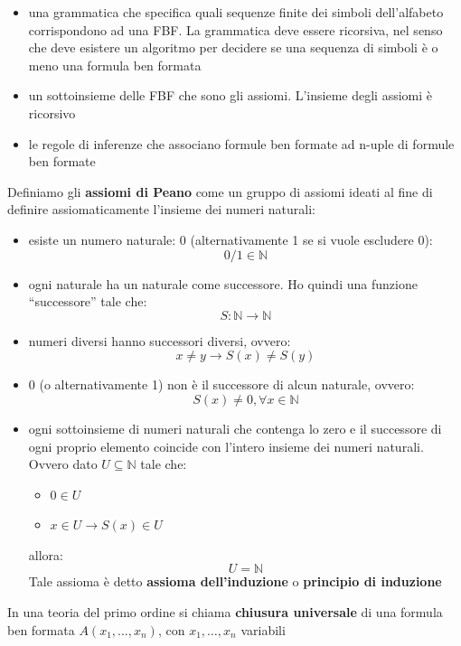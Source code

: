 \documentclass[a4paper,12pt, oneside]{book}
\begin{document}
\begin{shaded}
\begin{definizione}
\begin{itemize}
      \item una grammatica che specifica quali sequenze finite dei simboli
      dell'alfabeto corrispondono ad una FBF. La grammatica deve essere
      ricorsiva, nel senso che deve esistere un algoritmo per decidere se una
      sequenza di simboli è o meno una formula ben formata 
      \item un sottoinsieme delle FBF che sono gli assiomi. L'insieme degli
      assiomi è ricorsivo
      \item le regole di inferenze che associano formule ben formate ad n-uple
      di formule ben formate
    \end{itemize}
  \end{definizione}
  \begin{definizione}
    Definiamo gli \textbf{assiomi di Peano} come un gruppo di assiomi ideati al
    fine di definire assiomaticamente l'insieme dei numeri naturali:
    \begin{itemize}
      \item esiste un numero naturale: 0 (alternativamente 1 se si vuole escludere
      0):
      \[0/1\in \mathbb{N}\]
      \item ogni naturale ha un naturale come successore. Ho quindi una funzione
      ``successore'' tale che:
      \[S:\mathbb{N}\to\mathbb{N}\]
      \item numeri diversi hanno successori diversi, ovvero:
      \[x\neq y\to S(x)\neq S(y)\]
      \item 0 (o alternativamente 1) non è il successore di alcun naturale,
      ovvero:
      \[S(x)\neq 0, \forall x\in \mathbb{N}\]
      \item ogni sottoinsieme di numeri naturali che contenga lo zero e il
      successore di ogni proprio elemento coincide con l'intero insieme dei
      numeri 
      naturali. Ovvero dato $U\subseteq \mathbb{N}$ tale che:
      \begin{itemize}
        \item $0\in U$
        \item $x\in U\to S(x)\in U$
      \end{itemize}
      allora:
      \[U=\mathbb{N}\]
      Tale assioma è detto \textbf{assioma dell'induzione} o \textbf{principio di
        induzione} 
    \end{itemize}
  \end{definizione}
  \begin{definizione}
    In una teoria del primo ordine si chiama \textbf{chiusura universale} di una
    formula ben formata $A(x_1,\ldots,x_n)$, con $x_1,\ldots,x_n$ variabili

\end{definizione}
\end{shaded}
\end{document}

